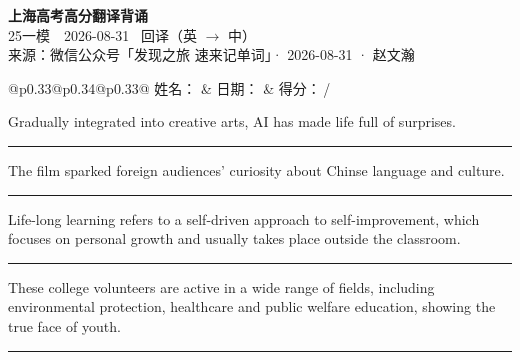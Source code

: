 \documentclass[11pt,a4paper]{article}
\newcommand{\num}[1]{\makebox[1.9em][r]{#1.}\hspace{0.3em}}
\newcommand{\wline}{\noindent\rule{\linewidth}{0.4pt}}
\begin{document}
\pagestyle{plain}
\begin{center}
{\LARGE\bfseries 上海高考高分翻译背诵 }\\[0.25em]
{\large 25一模　2026-08-31 \quad\ 回译（英 $\to$ 中）}\\[0.35em]
{\footnotesize 来源：微信公众号「发现之旅 速来记单词」· 2026-08-31 · 赵文瀚}
\end{center}

\vspace{0.4em}
\noindent\begin{tabular}{@{}p{0.33\textwidth}@{}p{0.34\textwidth}@{}p{0.33\textwidth}@{}}
姓名：\underline{\hspace{2.0cm}} & 日期：\underline{\hspace{2.0cm}} & 得分：\underline{\hspace{1.4cm}}\,/ \\
\end{tabular}

\vspace{0.5em}

\vspace{0.8em}
\num{1}Gradually integrated into creative arts, AI has made life full of surprises.

\vspace{0.25em}

\wline

\num{2}The film sparked foreign audiences’ curiosity about Chinse language and culture.

\vspace{0.25em}

\wline

\num{3}Life-long learning refers to a self-driven approach to self-improvement, which focuses on personal growth and usually takes place outside the classroom.

\vspace{0.25em}

\wline

\num{4}These college volunteers are active in a wide range of fields, including environmental protection, healthcare and public welfare education, showing the true face of youth.

\vspace{0.25em}

\wline
\end{document}
